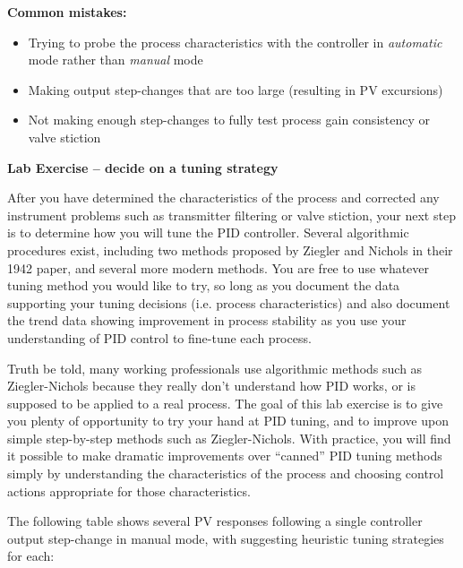 \vskip 10pt

{\bf Common mistakes:}

\begin{itemize}
\item{} Trying to probe the process characteristics with the controller in {\it automatic} mode rather than {\it manual} mode
\item{} Making output step-changes that are too large (resulting in PV excursions)
\item{} Not making enough step-changes to fully test process gain consistency or valve stiction
\end{itemize}







\vfil \eject

\noindent
{\bf Lab Exercise -- decide on a tuning strategy}

\vskip 5pt

After you have determined the characteristics of the process and corrected any instrument problems such as transmitter filtering or valve stiction, your next step is to determine how you will tune the PID controller.  Several algorithmic procedures exist, including two methods proposed by Ziegler and Nichols in their 1942 paper, and several more modern methods.  You are free to use whatever tuning method you would like to try, so long as you document the data supporting your tuning decisions (i.e. process characteristics) and also document the trend data showing improvement in process stability as you use your understanding of PID control to fine-tune each process.

Truth be told, many working professionals use algorithmic methods such as Ziegler-Nichols because they really don't understand how PID works, or is supposed to be applied to a real process.  The goal of this lab exercise is to give you plenty of opportunity to try your hand at PID tuning, and to improve upon simple step-by-step methods such as Ziegler-Nichols.  With practice, you will find it possible to make dramatic improvements over ``canned'' PID tuning methods simply by understanding the characteristics of the process and choosing control actions appropriate for those characteristics.

\vskip 10pt

The following table shows several PV responses following a single controller output step-change in manual mode, with suggesting heuristic tuning strategies for each:

